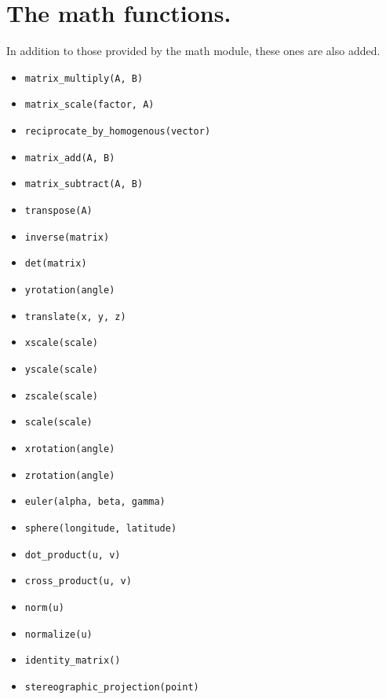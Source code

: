 \documentclass[12pt]{report}
\begin{document}
        \section{The math functions.}
            In addition to those provided by the math module, 
            these ones are also added.
            \begin{itemize}
                \item \texttt{matrix_multiply(A, B)}
                \item \texttt{matrix_scale(factor, A)}
                \item \texttt{reciprocate_by_homogenous(vector)}
                \item \texttt{matrix_add(A, B)}
                \item \texttt{matrix_subtract(A, B)}
                \item \texttt{transpose(A)}
                \item \texttt{inverse(matrix)}
                \item \texttt{det(matrix)}
                \item \texttt{yrotation(angle)}
                \item \texttt{translate(x, y, z)}
                \item \texttt{xscale(scale)}
                \item \texttt{yscale(scale)}
                \item \texttt{zscale(scale)}
                \item \texttt{scale(scale)}
                \item \texttt{xrotation(angle)}
                \item \texttt{zrotation(angle)}
                \item \texttt{euler(alpha, beta, gamma)}
                \item \texttt{sphere(longitude, latitude)}
                \item \texttt{dot_product(u, v)}
                \item \texttt{cross_product(u, v)}
                \item \texttt{norm(u)}
                \item \texttt{normalize(u)}
                \item \texttt{identity_matrix()}
                \item \texttt{stereographic_projection(point)}
            \end{itemize}
\end{document}
